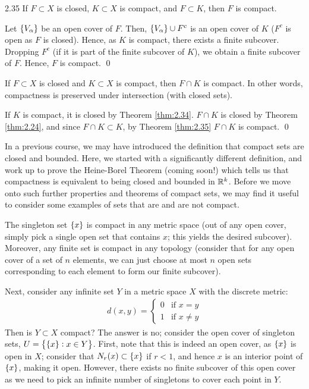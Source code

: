 \begin{theorem}{}{2.35}
    If $F \subset X$ is closed, $K \subset X$ is compact, and $F \subset K$, then $F$ is compact.
\end{theorem}

\begin{nproof}
    Let $\set{V_\alpha}$ be an open cover of $F$. Then, $\set{V_\alpha} \cup F^c$ is an open cover of $K$ ($F^c$ is open as $F$ is closed). Hence, as $K$ is compact, there exists a finite subcover. Dropping $F^c$ (if it is part of the finite subcover of $K$), we obtain a finite subcover of $F$. Hence, $F$ is compact. \qed
\end{nproof}

\begin{ncorollary}{}{}
    If $F \subset X$ is closed and $K \subset X$ is compact, then $F \cap K$ is compact. In other words, compactness is preserved under intersection (with closed sets).
\end{ncorollary}

\begin{nproof}
    If $K$ is compact, it is closed by Theorem \ref{thm:2.34}. $F \cap K$ is closed by Theorem \ref{thm:2.24}, and since $F \cap K \subset K$, by Theorem \ref{thm:2.35} $F \cap K$ is compact. \qed
\end{nproof}

\noindent In a previous course, we may have introduced the definition that compact sets are closed and bounded. Here, we started with a significantly different definition, and work up to prove the Heine-Borel Theorem (coming soon!) which tells us that compactness is equivalent to being closed and bounded in $\mathbb{R}^k$. Before we move onto such further properties and theorems of compact sets, we may find it useful to consider some examples of sets that are and are not compact.

The singleton set $\set{x}$ is compact in any metric space (out of any open cover, simply pick a single open set that contains $x$; this yields the desired subcover). Moreover, any finite set is compact in any topology (consider that for any open cover of a set of $n$ elements, we can just choose at most $n$ open sets corresponding to each element to form our finite subcover).

Next, consider any infinite set $Y$ in a metric space $X$ with the discrete metric:
\begin{align*}
    d(x, y) = \begin{cases}
        0 & \text{if $x = y$}
        \\ 1 & \text{if $x \neq y$}
    \end{cases}
\end{align*}
Then is $Y \subset X$ compact? The answer is no; consider the open cover of singleton sets, $U = \set{\set{x}: x \in Y}$. First, note that this is indeed an open cover, as $\set{x}$ is open in $X$; consider that $N_r(x) \subset \set{x}$ if $r < 1$, and hence $x$ is an interior point of $\set{x}$, making it open. However, there exists no finite subcover of this open cover as we need to pick an infinite number of singletons to cover each point in $Y$. 


